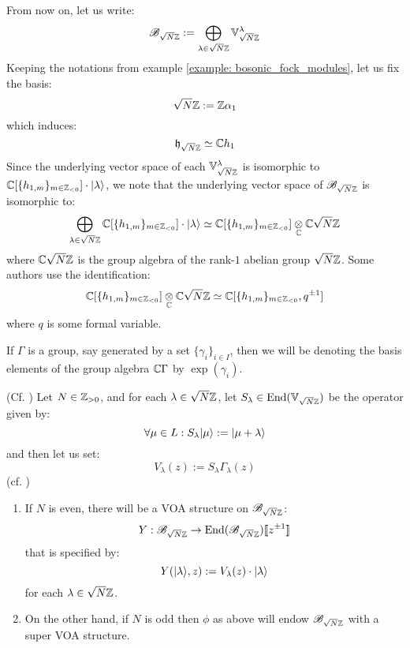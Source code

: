            \begin{convention}
                From now on, let us write:
                    $$\mathscr{B}_{\sqrt{N}\mathbb{Z}} := \bigoplus_{\lambda \in \sqrt{N} \mathbb{Z}} \mathbb{V}_{\sqrt{N} \mathbb{Z}}^{\lambda}$$
                Keeping the notations from example \ref{example: bosonic_fock_modules}, let us fix the basis:
                    $$\sqrt{N} \mathbb{Z} := \mathbb{Z} \alpha_1$$
                which induces:
                    $$\mathfrak{h}_{\sqrt{N} \mathbb{Z}} \simeq \mathbb{C} h_1$$
                Since the underlying vector space of each $\mathbb{V}_{\sqrt{N} \mathbb{Z}}^{\lambda}$ is isomorphic to $\mathbb{C}[\{h_{1, m}\}_{m \in \mathbb{Z}_{< 0}}] \cdot \lvert {\lambda} \rangle$, we note that the underlying vector space of $\mathscr{B}_{\sqrt{N} \mathbb{Z}}$ is isomorphic to:
                    $$\bigoplus_{\lambda \in \sqrt{N} \Z} \bbC[\{h_{1, m}\}_{m \in \Z_{< 0}}] \cdot \ket{\lambda} \cong \bbC[\{h_{1, m}\}_{m \in \Z_{< 0}}] \tensor_{\bbC} \bbC \sqrt{N} \Z$$
                where $\mathbb{C} \sqrt{N} \mathbb{Z}$ is the group algebra of the rank-$1$ abelian group $\sqrt{N} \mathbb{Z}$. Some authors use the identification:
                    $$\bbC[\{h_{1, m}\}_{m \in \Z_{< 0}}] \tensor_{\bbC} \bbC \sqrt{N} \Z \cong \bbC[\{h_{1, m}\}_{m \in \Z_{< 0}}, q^{\pm 1}]$$
                where $q$ is some formal variable.
            \end{convention}
            \begin{convention}
                If $\Gamma$ is a group, say generated by a set $\{\gamma_i\}_{i \in I}$, then we will be denoting the basis elements of the group algebra $\mathbb{C}\Gamma$ by $\exp(\gamma_i)$.
            \end{convention}
            \begin{theorem} \label{theorem: rank_1_bosonic_vertex_operators}
                (Cf. \cite[Proposition 5.2.5]{frenkel_ben_zvi_vertex_algebras_and_algebraic_curves}) Let $N \in \mathbb{Z}_{> 0}$, and for each $\lambda \in \sqrt{N} \mathbb{Z}$, let $S_{\lambda} \in \mathrm{End}(\mathbb{V}_{\sqrt{N} \mathbb{Z}})$ be the operator given by:
                    $$\forall \mu \in L: S_{\lambda} \lvert {\mu} \rangle := \lvert {\mu + \lambda} \rangle$$
                and then let us set:
                    $$V_{\lambda}(z) := S_{\lambda} \Gamma_{\lambda}(z)$$
                (cf. \cite[Equation 5.2.8, p. 83]{frenkel_ben_zvi_vertex_algebras_and_algebraic_curves})
                \begin{enumerate}
                    \item If $N$ is even, there will be a VOA structure on $\mathscr{B}_{\sqrt{N} \mathbb{Z}}$:
                        $$Y: \mathscr{B}_{\sqrt{N} \mathbb{Z}} \to \mathrm{End}(\mathscr{B}_{\sqrt{N} \mathbb{Z}})[\![z^{\pm 1}]\!]$$
                    that is specified by:
                        $$Y(\lvert {\lambda} \rangle, z) := V_{\lambda}(z) \cdot \lvert {\lambda} \rangle$$
                    for each $\lambda \in \sqrt{N} \mathbb{Z}$.
                    \item On the other hand, if $N$ is odd then $\phi$ as above will endow $\mathscr{B}_{\sqrt{N} \mathbb{Z}}$ with a super VOA structure.
                \end{enumerate}
            \end{theorem}
